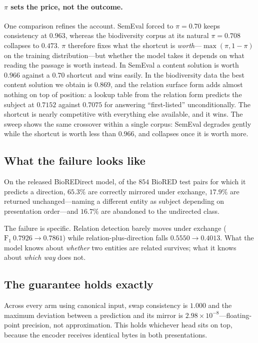 \documentclass[11pt]{article}
\begin{document}
\paragraph{$\pi$ sets the price, not the outcome.} One comparison refines the account. SemEval
forced to $\pi = 0.70$ keeps consistency at $0.963$, whereas the biodiversity corpus at its
natural $\pi = 0.708$ collapses to $0.473$. $\pi$ therefore fixes what the shortcut is
\emph{worth}---$\max(\pi, 1-\pi)$ on the training distribution---but whether the model takes it
depends on what reading the passage is worth instead. In SemEval a content solution is worth
$0.966$ against a $0.70$ shortcut and wins easily. In the biodiversity data the best content
solution we obtain is $0.869$, and the relation surface form adds almost nothing on top of
position: a lookup table from the relation form predicts the subject at $0.7152$ against
$0.7075$ for answering ``first-listed'' unconditionally. The shortcut is nearly competitive
with everything else available, and it wins. The sweep shows the same crossover within a single
corpus: SemEval degrades gently while the shortcut is worth less than $0.966$, and collapses
once it is worth more.

\subsection{What the failure looks like}
\label{sec:res-inconsistency}
On the released BioREDirect model, of the $854$ BioRED test pairs for which it predicts a
direction, $65.3\%$ are correctly mirrored under exchange, $17.9\%$ are returned
unchanged---naming a different entity as subject depending on presentation order---and $16.7\%$
are abandoned to the undirected class.

The failure is specific. Relation detection barely moves under exchange
($\mathrm{F}_1\ 0.7926 \rightarrow 0.7861$) while relation-plus-direction falls
$0.5550 \rightarrow 0.4013$. What the model knows about \emph{whether} two entities are related
survives; what it knows about \emph{which way} does not.

\subsection{The guarantee holds exactly}
\label{sec:res-guarantee}
Across every arm using canonical input, swap consistency is $1.000$ and the maximum deviation
between a prediction and its mirror is $2.98\times10^{-8}$---floating-point precision, not
approximation. This holds whichever head sits on top, because the encoder receives identical
bytes in both presentations.
\end{document}
